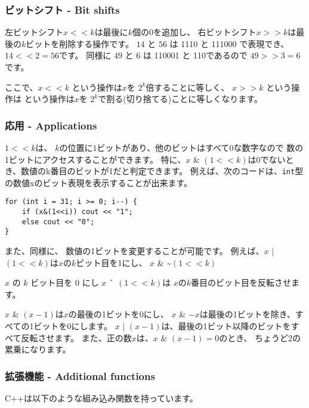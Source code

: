 \subsubsection{ビットシフト - Bit shifts}


左ビットシフト$x < < k$は最後に$k$個の0を追加し、
右ビットシフト$x > > k$は最後の$k$ビットを削除する操作です。
$14$ と $56$ は 1110 と 111000 で表現でき、$14 < < 2 = 56$です。
同様に
$49$ と $6$ は 110001 と 110であるので $49 > > 3 = 6$です。

ここで、$x < < k$
という操作は$x$を $2^k$倍することに等しく、
$x > > k$
という操作は
という操作は$x$を $2^k$で割る(切り捨てる)ことに等しくなります。

\subsubsection{応用 - Applications}

$1 < < k$は、
$k$の位置に$1$ビットがあり、他のビットはすべて0な数字なので
数の1ビットにアクセスすることができます。
特に、$x$ \& $(1 < < k)$は0でないとき、数値のk番目のビットが1だと判定できます。
例えば、次のコードは、\texttt{int}型の数値xのビット表現を表示することが出来ます。

\begin{lstlisting}
for (int i = 31; i >= 0; i--) {
    if (x&(1<<i)) cout << "1";
    else cout << "0";
}
\end{lstlisting}

また、同様に、
数値の1ビットを変更することが可能です。
例えば、$x$ | $(1 < < k)$は$x$の$k$ビット目を1にし、
$x$ \& \textasciitilde $(1 < < k)$

$x$ の $k$ ビット目を 0 にし
$x$ $\XOR$ $(1 < < k)$は
$x$の$k$番目のビット目を反転させます。

$x$ \& $(x-1)$は$x$の最後の1ビットを0にし、
$x$ \& $-x$は最後の1ビットを除き、すべての1ビットを0にします。
$x$ | $(x-1)$は、最後の1ビット以降のビットをすべて反転させます。
また、正の数$x$は、$x$ \& $(x-1) = 0$のとき、
ちょうど2の累乗になります。

\subsubsection*{拡張機能 - Additional functions}

C++は以下のような組み込み関数を持っています。

